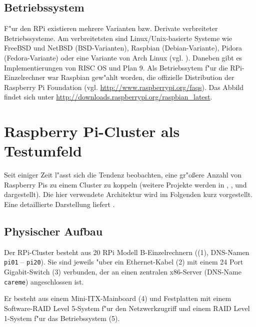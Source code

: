
\subsection{Betriebssystem}\label{RPi-OS}

F"ur den RPi existieren mehrere Varianten bzw. Derivate verbreiteter Betriebssysteme. Am verbreitetsten sind Linux/Unix-basierte Systeme wie FreeBSD und NetBSD (BSD-Varianten), Raspbian (Debian-Variante), Pidora (Fedora-Variante) oder eine Variante von Arch Linux (vgl. \cite{pow12}). Daneben gibt es Implementierungen von RISC OS und Plan 9. Als Betriebssytem f"ur die RPi-Einzelrechner war Raspbian gew"ahlt worden, die offizielle Distribution der Raspberry Pi Foundation (vgl. \url{http://www.raspberrypi.org/faqs}). Das Abbild findet sich unter \url{http://downloads.raspberrypi.org/raspbian_latest}. 

\section{Raspberry Pi-Cluster als Testumfeld}\label{Bramble-Spezi}

Seit einiger Zeit l"asst sich die Tendenz beobachten, eine gr"o\ss ere Anzahl von Raspberry Pis zu einem Cluster zu koppeln (weitere Projekte werden in \cite{cox13}, \cite{kie01}, \cite{bal12} und \cite{ou13} dargestellt). Die hier verwendete Architektur wird im Folgenden kurz vorgestellt. Eine detaillierte Darstellung liefert \cite{kli13}. 

\subsection{Physischer Aufbau}\label{Bramble-Hardware}

Der RPi-Cluster besteht aus 20 RPi Modell B-Einzelrechnern ((1), DNS-Namen \texttt{pi01} -- \texttt{pi20}). Sie sind jeweils "uber ein Ethernet-Kabel (2) mit einem 24 Port Gigabit-Switch (3) verbunden, der an einen zentralen x86-Server (DNS-Name \texttt{careme}) angeschlossen ist. 

Er besteht aus einem Mini-ITX-Mainboard (4) und %
Festplatten mit einem Software-RAID Level 5-System f"ur den Netzwerkzugriff und einem RAID Level 1-System f"ur das Betriebssystem (5).  

